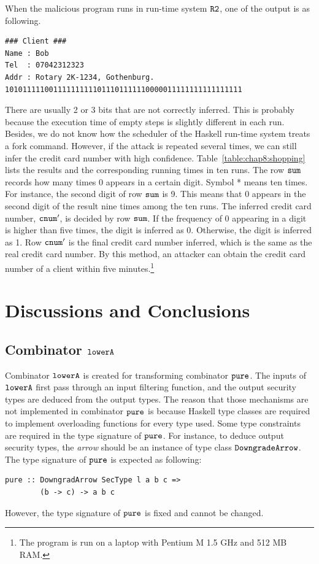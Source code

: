 \documentclass{report}
\newcommand{\co}[1]{$\cod{#1}$}
\begin{document}
When the malicious program runs in run-time system \co{R2}, one of the output is as following.
\begin{Verbatim}[fontsize=\small]
### Client ###
Name : Bob
Tel  : 07042312323
Addr : Rotary 2K-1234, Gothenburg.
101011111001111111111011101111110000011111111111111111
\end{Verbatim}
There are usually 2 or 3 bits that are not correctly inferred. This is probably because the execution time of 
empty steps is slightly different in each run. Besides, we do not know how the scheduler of the Haskell run-time
system treats a fork command.
However, if the attack is repeated several times, we can still infer the credit card number with high
confidence. Table~\ref{table:chap8:shopping} lists the results and the corresponding running times in ten runs. 
The row \co{sum} records how many times 0 appears in a certain digit. Symbol * means ten times.
For instance, the second digit of row \co{sum} is 9. This means that 0 appears in the second digit
of the result nine times among the ten runs. The inferred credit card number, \co{cnum'}, is decided by row \co{sum}.
If the frequency of 0 appearing in a digit is higher than five times, the digit is inferred as 0.
Otherwise, the digit is inferred as 1. Row \co{cnum'} is the final credit card number inferred, which
is the same as the real credit card number. By this method, an attacker can obtain the credit card number of a client
within five minutes.\footnote{The program is run on a laptop with Pentium M 1.5 GHz and 512 MB RAM.}




\chapter{Discussions and Conclusions}

\section{Combinator \co{lowerA}}
Combinator \co{lowerA} is created for transforming combinator \co{pure}.
The inputs of \co{lowerA} first pass through an input filtering function, and
the output security types are deduced from the output types.
The reason that those mechanisms are not implemented in combinator \co{pure}
is because Haskell type classes are required to implement overloading functions
for every type used. Some type constraints are required in the type signature of
\co{pure}. For instance, to deduce output security types, the {\em arrow} should be
an instance of type class \co{DowngradeArrow}. The type signature of \co{pure}
is expected as following:
\begin{Verbatim}[fontsize=\small]
pure :: DowngradArrow SecType l a b c => 
        (b -> c) -> a b c
\end{Verbatim}
However, the type signature of \co{pure} is fixed and cannot be changed.
\end{document}
